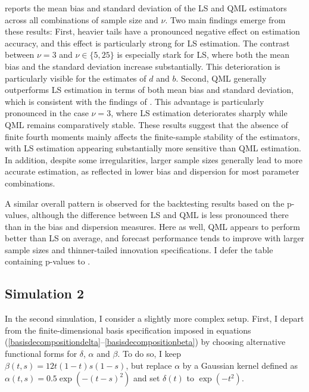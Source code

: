 \documentclass[12pt,a4paper]{article}
\theoremstyle{definition}
\begin{document}
 reports the mean bias and standard deviation of the LS and QML estimators across all combinations of sample size and $\nu$. Two main findings emerge from these results: First, heavier tails have a pronounced negative effect on estimation accuracy, and this effect is particularly strong for LS estimation. The contrast between $\nu=3$ and $\nu \in\{5,25\}$ is especially stark for LS, where both the mean bias and the standard deviation increase substantially. This deterioration is particularly visible for the estimates of $d$ and $b$. Second, QML generally outperforms LS estimation in terms of both mean bias and standard deviation, which is consistent with the findings of \citet{Cerovecki2019}. This advantage is particularly pronounced in the case $\nu = 3$, where LS estimation deteriorates sharply while QML remains comparatively stable. These results suggest that the absence of finite fourth moments mainly affects the finite-sample stability of the estimators, with LS estimation appearing substantially more sensitive than QML estimation. In addition, despite some irregularities, larger sample sizes generally lead to more accurate estimation, as reflected in lower bias and dispersion for most parameter combinations.

A similar overall pattern is observed for the backtesting results based on the p-values, although the difference between LS and QML is less pronounced there than in the bias and dispersion measures. Here as well, QML appears to perform better than LS on average, and forecast performance tends to improve with larger sample sizes and thinner-tailed innovation specifications. I defer the table containing p-values to .
\subsection{Simulation 2}
\label{subsec:Simulation2}
In the second simulation, I consider a slightly more complex setup. First, I depart from the finite-dimensional basis specification imposed in equations (\ref{basisdecompositiondelta}--\ref{basisdecompositionbeta}) by choosing alternative functional forms for $\delta$, $\alpha$ and $\beta$. To do so, I keep $\beta(t,s)=12t(1-t)s(1-s)$, but replace $\alpha$ by a Gaussian kernel defined as $\alpha(t,s) = 0.5 \exp(-(t-s)^2)$ and set $\delta(t)$ to $\exp(-t^2)$.
\end{document}
